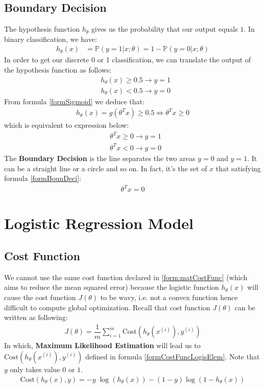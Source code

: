 \subsection{Boundary Decision}
The hypothesis function $h_\theta$ gives us the probability that our output equals $1$. In binary classification, we have:
\begin{align*}
h_\theta(x) &= \mathbb{P}(y=1 | x ; \theta) = 1 - \mathbb{P}(y=0 | x ; \theta)
\end{align*} 
In order to get our discrete 0 or 1 classification, we can translate the output of the hypothesis function as follows:
\begin{align*}
& h_\theta(x) \geq 0.5 \rightarrow y = 1 \\
& h_\theta(x) < 0.5 \rightarrow y = 0
\end{align*}
From formula \eqref{formSigmoid} we deduce that:
\begin{align*}
h_\theta(x) = g(\theta^T x) \geq 0.5 \Leftrightarrow \theta^T x \geq 0
\end{align*}
which is equivalent to expression below: 
\begin{align}
& \theta^T x \geq 0 \rightarrow y = 1 \\
& \theta^T x < 0 \rightarrow y = 0 \nonumber
\end{align}
The \textbf{Boundary Decision} is the line separates the two areas $y = 0$ and $y = 1$. It can be a straight line or a circle and so on. In fact, it's the set of $x$ that satisfying formula \eqref{formBounDeci}:
\begin{align} \label{formBounDeci}
\theta^Tx = 0
\end{align}

\section{Logistic Regression Model}

\subsection{Cost Function}
We cannot use the same cost function declared in \eqref{form:matCostFunc} (which aims to reduce the mean squared error) because the logistic function $h_\theta(x)$ will cause the cost function $J(\theta)$ to be wavy, i.e. not a convex function hence difficult to compute global optimization. Recall that cost function $J(\theta)$ can be written as following:
\begin{align}
J(\theta) = \dfrac{1}{m} \sum_{i=1}^m \mathrm{Cost}(h_\theta(x^{(i)}),y^{(i)})
\end{align}
In which, \textbf{Maximum Likelihood Estimation} will lead us to $\mathrm{Cost}(h_\theta(x^{(i)}),y^{(i)})$ defined in formula \eqref{formCostFuncLogisElem}. Note that $y$ only takes value $0$ or $1$.
\begin{align} \label{formCostFuncLogisElem}
\mathrm{Cost}(h_\theta(x),y) = - y \; \log(h_\theta(x)) - (1 - y) \log(1 - h_\theta(x))
\end{align}


